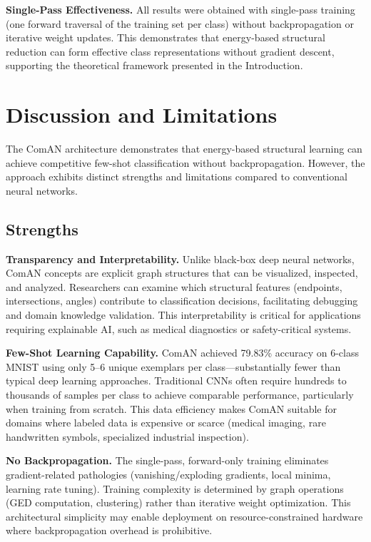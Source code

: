 \documentclass[12pt, a4paper]{article}
\begin{document}
\textbf{Single-Pass Effectiveness.} All results were obtained with single-pass training (one forward traversal of the training set per class) without backpropagation or iterative weight updates. This demonstrates that energy-based structural reduction can form effective class representations without gradient descent, supporting the theoretical framework presented in the Introduction.

\section{Discussion and Limitations}

The ComAN architecture demonstrates that energy-based structural learning can achieve competitive few-shot classification without backpropagation. However, the approach exhibits distinct strengths and limitations compared to conventional neural networks.

\subsection{Strengths}

\textbf{Transparency and Interpretability.} Unlike black-box deep neural networks, ComAN concepts are explicit graph structures that can be visualized, inspected, and analyzed. Researchers can examine which structural features (endpoints, intersections, angles) contribute to classification decisions, facilitating debugging and domain knowledge validation. This interpretability is critical for applications requiring explainable AI, such as medical diagnostics or safety-critical systems.

\textbf{Few-Shot Learning Capability.} ComAN achieved 79.83\% accuracy on 6-class MNIST using only 5--6 unique exemplars per class---substantially fewer than typical deep learning approaches. Traditional CNNs often require hundreds to thousands of samples per class to achieve comparable performance, particularly when training from scratch. This data efficiency makes ComAN suitable for domains where labeled data is expensive or scarce (medical imaging, rare handwritten symbols, specialized industrial inspection).

\textbf{No Backpropagation.} The single-pass, forward-only training eliminates gradient-related pathologies (vanishing/exploding gradients, local minima, learning rate tuning). Training complexity is determined by graph operations (GED computation, clustering) rather than iterative weight optimization. This architectural simplicity may enable deployment on resource-constrained hardware where backpropagation overhead is prohibitive.
\end{document}
